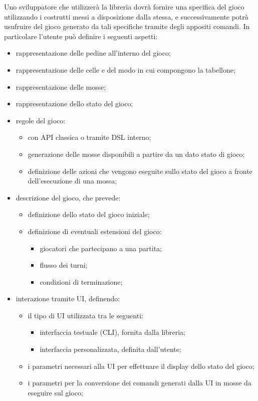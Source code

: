 Uno sviluppatore che utilizzerà la libreria dovrà fornire una specifica del gioco utilizzando i costrutti messi a disposizione dalla stessa, e successivamente potrà usufruire del gioco generato da tali specifiche tramite degli appositi comandi.
%
In particolare l'utente può definire i seguenti aspetti:
%
\begin{itemize}
    \item rappresentazione delle pedine all'interno del gioco;
    \item rappresentazione delle celle e del modo in cui compongono la tabellone;
    \item rappresentazione delle mosse;
    \item rappresentazione dello stato del gioco;
    \item regole del gioco:
    \begin{itemize}
        \item con API classica o tramite DSL interno;
        \item generazione delle mosse disponibili a partire da un dato stato di gioco;
        \item definizione delle azioni che vengono eseguite sullo stato del gioco a fronte dell'esecuzione di una mossa;
    \end{itemize}
    \item descrizione del gioco, che prevede:
    \begin{itemize}
        \item definizione dello stato del gioco iniziale;
        \item definizione di eventuali estensioni del gioco:
        \begin{itemize}
            \item giocatori che partecipano a una partita;
            \item flusso dei turni;
            \item condizioni di terminazione;
        \end{itemize}
    \end{itemize}
    \item interazione tramite UI, definendo:
    \begin{itemize}
        \item il tipo di UI utilizzata tra le seguenti:
        \begin{itemize}
            \item interfaccia testuale (CLI), fornita dalla libreria;
            \item interfaccia personalizzata, definita dall'utente;
        \end{itemize}
        \item i parametri necessari alla UI per effettuare il display dello stato del gioco;
        \item i parametri per la conversione dei comandi generati dalla UI in mosse da eseguire sul gioco;
    \end{itemize}
\end{itemize}

